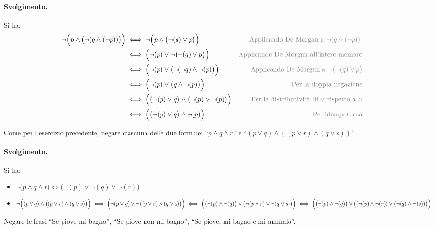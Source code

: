 \paragraph*{Svolgimento.} Si ha:
\begin{align*}
	\neg \Bigl(p \land \bigl( \neg (q \land (\neg p)) \bigr)\Bigr) &\iff \neg \Bigl(p \land \bigl( \neg(q) \lor p \bigr) \Bigr)& \text{\textcolor{gray}{Applicando De Morgan a $\neg (q \land (\neg p))$ }} \\
	&\iff \Bigl( \neg(p) \lor \neg \bigl( \neg(q) \lor p \bigr)\Bigr)  & \text{\textcolor{gray}{Applicando De Morgan all'intero membro}} \\
	&\iff \Bigl( \neg(p) \lor \bigl( \neg(\neg q) \land \neg (p) \bigr)\Bigr) & \text{\textcolor{gray}{Applicando De Morgan a $\neg \bigl( \neg(q) \lor p \bigr)$}}\\
	&\iff \Bigl( \neg(p) \lor \bigl( q \land \neg(p) \bigr)\Bigr) & \text{\textcolor{gray}{Per la doppia negazione}}\\
	&\iff \Bigl( \bigl(\neg(p) \lor q \bigr) \land \bigl(\neg(p) \lor \neg(p)\bigr)\Bigr) & \text{\textcolor{gray}{Per la distributività di $\lor$ rispetto a $\land$}} \\
	&\iff \Bigl( \bigl(\neg(p) \lor q \bigr) \land \neg(p) \Bigr) & \text{\textcolor{gray}{Per idempotenza}} \\
\end{align*}
\begin{flushright}
	\blacksquare
\end{flushright}
\begin{exsbox}
	Come per l'esercizio precedente, negare ciascuna delle due formule: ``$p \land
	q \land r$'' e ``$(p \lor q)\land((p \lor r)\land(q \lor s))$''
\end{exsbox}
\paragraph*{Svolgimento.} Si ha:
\begin{itemize}
	\item $\neg \bigl(p \land q \land r \bigr) \iff \bigl( \neg(p) \lor \neg(q) \lor \neg(r)\bigr)$
	\item $\neg \Bigl( (p \lor q) \land \bigl((p \lor r)\land(q \lor s)\bigr)\Bigr) \iff \Bigl(\neg(p \lor q) \lor \neg \bigl( (p \lor r)\land(q \lor s) \bigr)\Bigr) \iff \Bigl( \bigl(\neg(p) \land \neg(q)\bigr) \lor \bigl( \neg(p \lor r) \lor \neg(q \lor s)\bigr)\Bigr) \iff \Bigl( \bigl(\neg(p) \land \neg(q)\bigr) \lor \bigl( ( \neg(p) \land \neg (r)) \lor (\neg (q) \land \neg (s))\bigr)\Bigr)$
\end{itemize}
\begin{flushright}
	\blacksquare
\end{flushright}
\begin{exsbox}
	Negare le frasi ``Se piove mi bagno'', ``Se piove non mi bagno'', ``Se piove, mi bagno e mi ammalo''.
\end{exsbox}
